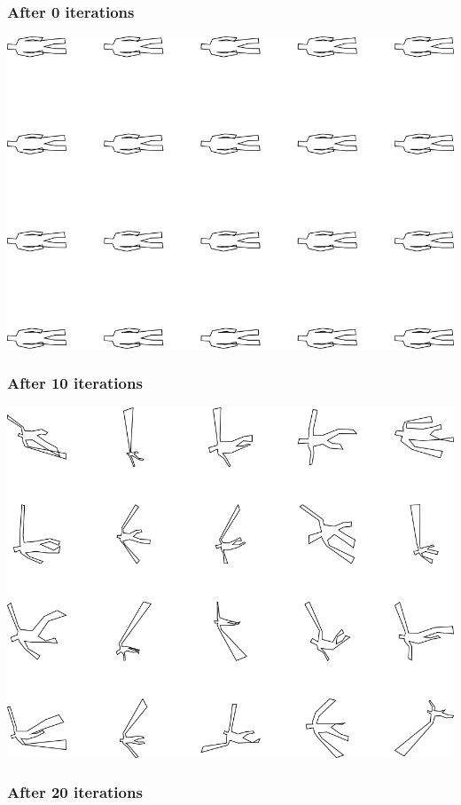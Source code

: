 \subsubsection{After 0 iterations}

\includegraphics[width=6in]{output/3.learning/concentration/concentration_psw1000000_iter0_.png}
\subsubsection{After 10 iterations}

\includegraphics[width=6in]{output/3.learning/concentration/concentration_psw1000000_iter10_.png}
\subsubsection{After 20 iterations}

